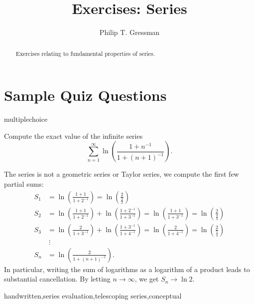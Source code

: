 \documentclass{ximera}
\title{Exercises: Series}
\author{Philip T. Gressman}
\begin{document}
\begin{abstract}
Exercises relating to fundamental properties of series.
\end{abstract}
\maketitle


\section*{Sample Quiz Questions}

\begin{question}[2019Telescope1]
\begin{type}
multiplechoice
\end{type}
Compute the exact value of the infinite series
\[ \sum_{n=1}^\infty \ln \left( \frac{1 + n^{-1}}{1 + (n+1)^{-1}} \right). \]
\begin{multiplechoice}
\end{multiplechoice}
\begin{feedback}
The series is not a geometric series or Taylor series, we compute the first few partial sums:
\[ 
\begin{aligned}
S_1 & = \ln \left( \frac{1 + 1}{1 + 2^{-1}} \right)  = \ln \left( \frac{2}{\frac{3}{2}} \right) \\
S_2 & = \ln \left( \frac{1 + 1}{1 + 2^{-1}} \right)  + \ln \left( \frac{1 + 2^{-1}}{1 + 3^{-1}} \right)  = \ln \left( \frac{1 + 1}{1 + 3^{-1}} \right) = \ln \left( \frac{2}{\frac{4}{3}} \right) \\
S_3 & = \ln \left( \frac{2}{1 + 3^{-1}} \right)  + \ln \left( \frac{1 + 3^{-1}}{1 + 4^{-1}} \right)  = \ln \left( \frac{2}{1 + 4^{-1}} \right) = \ln \left( \frac{2}{\frac{5}{4}} \right) \\
& \ \vdots  \\
S_n & = \ln \left( \frac{2}{1 + (n+1)^{-1}} \right).
 \end{aligned}
\]
In particular, writing the sum of logarithms as a logarithm of a product leads to substantial cancellation.  By letting \(n \rightarrow \infty\), we get \(S_n \rightarrow \ln 2\).
\end{feedback}
\begin{keywords}
handwritten,series evaluation,telescoping series,conceptual
\end{keywords}
\end{question}
\end{document}
